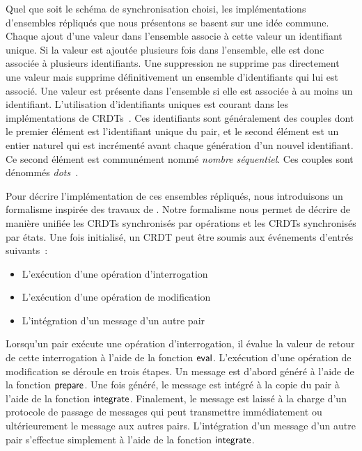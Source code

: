 Quel que soit le schéma de synchronisation choisi, les implémentations d'ensembles répliqués que nous présentons se basent sur une idée commune.
Chaque ajout d'une valeur dans l'ensemble associe à cette valeur un identifiant unique.
Si la valeur est ajoutée plusieurs fois dans l'ensemble, elle est donc associée à plusieurs identifiants.
Une suppression ne supprime pas directement une valeur mais supprime définitivement un ensemble d'identifiants qui lui est associé.
Une valeur est présente dans l'ensemble si elle est associée à au moins un identifiant.
L'utilisation d'identifiants uniques est courant dans les implémentations de \acp{CRDT}~\autocite{baquero_2018_pure-op-crdt,almeida_2018_delta-crdt-revisited}.
Ces identifiants sont généralement des couples dont le premier élément est l'identifiant unique du pair, et le second élément est un entier naturel qui est incrémenté avant chaque génération d'un nouvel identifiant.
Ce second élément est communément nommé \emph{nombre séquentiel}.
Ces couples sont dénommés \emph{dots}~\autocite{baquero_2018_pure-op-crdt}.

Pour décrire l'implémentation de ces ensembles répliqués, nous introduisons un formalisme inspirée des travaux de \textcite{baquero_2018_pure-op-crdt}.
Notre formalisme nous permet de décrire de manière unifiée les \acp{CRDT} synchronisés par opérations et les \acp{CRDT} synchronisés par états.
Une fois initialisé, un \ac{CRDT} peut être soumis aux événements d'entrés suivants~:
\begin{itemize}
\item L'exécution d'une opération d'interrogation
\item L'exécution d'une opération de modification
\item L'intégration d'un message d'un autre pair
\end{itemize}

Lorsqu'un pair exécute une opération d'interrogation, il évalue la valeur de retour de cette interrogation à l'aide de la fonction $\operatorname{\mathsf{eval}}$.
L'exécution d'une opération de modification se déroule en trois étapes.
Un message est d'abord généré à l'aide de la fonction $\operatorname{\mathsf{prepare}}$.
Une fois généré, le message est intégré à la copie du pair à l'aide de la fonction $\operatorname{\mathsf{integrate}}$.
Finalement, le message est laissé à la charge d'un protocole de passage de messages qui peut transmettre immédiatement ou ultérieurement le message aux autres pairs.
L'intégration d'un message d'un autre pair s'effectue simplement à l'aide de la fonction $\operatorname{\mathsf{integrate}}$.

